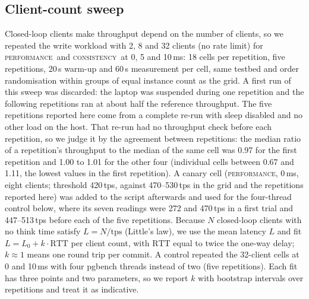 \documentclass[preprint,12pt]{elsarticle}
\newcommand{\perf}{\textsc{performance}}
\newcommand{\cons}{\textsc{consistency}}
\begin{document}
\subsection{Client-count sweep}\label{sec:sweepmethod}
Closed-loop clients make throughput depend on the number of clients, so we repeated the write workload with 2, 8 and 32 clients (no rate limit) for \perf\ and \cons\ at 0, 5 and 10\,ms: 18 cells per repetition, five repetitions, 20\,s warm-up and 60\,s measurement per cell, same testbed and order randomisation within groups of equal instance count as the grid. A first run of this sweep was discarded: the laptop was suspended during one repetition and the following repetitions ran at about half the reference throughput. The five repetitions reported here come from a complete re-run with sleep disabled and no other load on the host. That re-run had no throughput check before each repetition, so we judge it by the agreement between repetitions: the median ratio of a repetition's throughput to the median of the same cell was 0.97 for the first repetition and 1.00 to 1.01 for the other four (individual cells between 0.67 and 1.11, the lowest values in the first repetition). A canary cell (\perf, 0\,ms, eight clients; threshold 420\,tps, against 470--530\,tps in the grid and the repetitions reported here) was added to the script afterwards and used for the four-thread control below, where its seven readings were 272 and 470\,tps in a first trial and 447--513\,tps before each of the five repetitions. Because $N$ closed-loop clients with no think time satisfy $L = N/\mathrm{tps}$ (Little's law), we use the mean latency $L$ and fit $L = L_0 + k\cdot\mathrm{RTT}$ per client count, with $\mathrm{RTT}$ equal to twice the one-way delay; $k\approx 1$ means one round trip per commit. A control repeated the 32-client cells at 0 and 10\,ms with four pgbench threads instead of two (five repetitions). Each fit has three points and two parameters, so we report $k$ with bootstrap intervals over repetitions and treat it as indicative.
\end{document}
